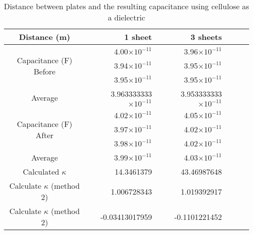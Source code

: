 \documentclass [12pt, letterpaper, twoside] {article}
\begin{document}
\begin{table}[h!]
  \centering
  \begin{tabular}{| c | r | r | r | r | r |}
    \hline\hline
    Distance (m) & 1 sheet & 3 sheets \\
    \hline
    \multirow {3}{*}{Capacitance (F) Before} & 4.00\(\times10^{-11}\) & 3.96\(\times10^{-11}\) \\
    & 3.94\(\times10^{-11}\) & 3.95\(\times10^{-11}\) \\
    & 3.95\(\times10^{-11}\) & 3.95\(\times10^{-11}\) \\
    \hline
    Average & 3.963333333\(\times10^{-11}\) & 3.953333333\(\times10^{-11}\) \\
    \hline
    \multirow {3}{*}{Capacitance (F) After} & 4.02\(\times10^{-11}\) & 4.05\(\times10^{-11}\) \\
    & 3.97\(\times10^{-11}\) & 4.02\(\times10^{-11}\) \\
    & 3.98\(\times10^{-11}\) & 4.02\(\times10^{-11}\) \\
    \hline
    Average & 3.99\(\times10^{-11}\) & 4.03\(\times10^{-11}\) \\
    \hline
    Calculated \(\kappa\) & 14.3461379 & 43.46987648 \\
    \hline
    Calculate \(\kappa\) (method 2) & 1.006728343 & 1.019392917 \\
    \hline
    Calculate \(\kappa\) (method 2) & -0.03413017959 & -0.1101221452 \\
    \hline\hline
  \end{tabular}
  \caption{Distance between plates and the resulting capacitance using cellulose as a dielectric}
\end{table}
\end{document}
